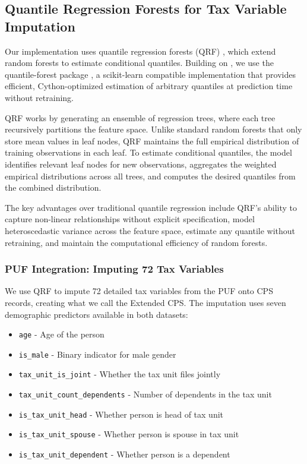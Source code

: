\subsection{Quantile Regression Forests for Tax Variable Imputation}

Our implementation uses quantile regression forests (QRF) \citep{meinshausen2006quantile}, which extend random forests to estimate conditional quantiles. Building on \citet{woodruff2023survey}, we use the quantile-forest package \citep{zillow2024quantile}, a scikit-learn compatible implementation that provides efficient, Cython-optimized estimation of arbitrary quantiles at prediction time without retraining.

QRF works by generating an ensemble of regression trees, where each tree recursively partitions the feature space. Unlike standard random forests that only store mean values in leaf nodes, QRF maintains the full empirical distribution of training observations in each leaf. To estimate conditional quantiles, the model identifies relevant leaf nodes for new observations, aggregates the weighted empirical distributions across all trees, and computes the desired quantiles from the combined distribution.

The key advantages over traditional quantile regression include QRF's ability to capture non-linear relationships without explicit specification, model heteroscedastic variance across the feature space, estimate any quantile without retraining, and maintain the computational efficiency of random forests.

\subsubsection{PUF Integration: Imputing 72 Tax Variables}

We use QRF to impute 72 detailed tax variables from the PUF onto CPS records, creating what we call the Extended CPS. The imputation uses seven demographic predictors available in both datasets:

\begin{itemize}
    \item \texttt{age} - Age of the person
    \item \texttt{is\_male} - Binary indicator for male gender  
    \item \texttt{tax\_unit\_is\_joint} - Whether the tax unit files jointly
    \item \texttt{tax\_unit\_count\_dependents} - Number of dependents in the tax unit
    \item \texttt{is\_tax\_unit\_head} - Whether person is head of tax unit
    \item \texttt{is\_tax\_unit\_spouse} - Whether person is spouse in tax unit
    \item \texttt{is\_tax\_unit\_dependent} - Whether person is a dependent
\end{itemize}

